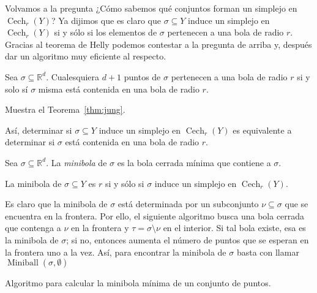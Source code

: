\documentclass{standalone}
\begin{document}
	Volvamos a la pregunta ¿Cómo sabemos qué conjuntos forman un simplejo en $\operatorname{Cech}_{r}(Y)$? Ya dijimos que es claro que $\sigma\subseteq Y$ induce un simplejo en $\operatorname{Cech}_{r}(Y)$ si y sólo si los elementos de $\sigma$ pertenecen a una bola de radio $r$. Gracias al teorema de Helly podemos contestar a la pregunta de arriba y, después dar un algoritmo muy eficiente al respecto.
	
	\begin{theorem}\label{thm:jung}
		Sea $\sigma\subseteq\mathbb{R}^{d}$. Cualesquiera $d+1$ puntos de $\sigma$ pertenecen a una bola de radio $r$ si y solo sí $\sigma$ misma está contenida en una bola de radio $r$.
	\end{theorem}
	
	\begin{exercise}
		Muestra el Teorema~\ref{thm:jung}.
	\end{exercise}
	
	Así, determinar si $\sigma\subseteq Y$ induce un simplejo en $\operatorname{Cech}_{r}(Y)$ es equivalente a determinar si $\sigma$ está contenida en una bola de radio $r$.
	
	\begin{definition}\label{def:miniball}
		Sea $\sigma\subseteq\mathbb{R}^{d}$. La \emph{minibola} de $\sigma$ es la bola cerrada mínima que contiene a $\sigma$.
	\end{definition}
	
	\begin{exercise}
		La minibola de $\sigma\subseteq Y$ es $r$ si y sólo si $\sigma$ induce un simplejo en $\operatorname{Cech}_{r}(Y)$.
	\end{exercise}
	
	Es claro que la minibola de $\sigma$ está determinada por un subconjunto $\nu\subseteq\sigma$ que se encuentra en la frontera. Por ello, el siguiente algoritmo busca una bola cerrada que contenga a $\nu$ en la frontera y $\tau=\sigma\setminus\nu$ en el interior. Si tal bola existe, esa es la minibola de $\sigma$; si no, entonces aumenta el número de puntos que se esperan en la frontera uno a la vez. Así, para encontrar la minibola de $\sigma$ basta con llamar $\operatorname{Miniball}(\sigma, \emptyset)$
	
	\begin{algorithm}
		\DontPrintSemicolon
		\caption{Algoritmo para calcular la minibola mínima de un conjunto de puntos.}
	\end{algorithm}
	
\end{document}
